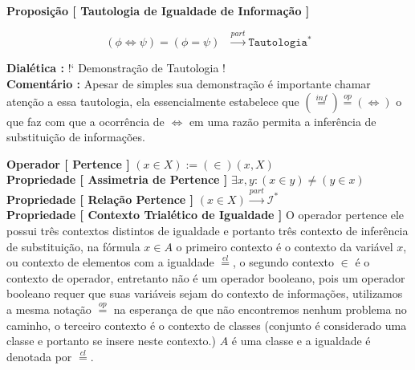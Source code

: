 \documentclass[10pt,a4paper]{report}
\begin{document}
\hspace{\baselineskip}

\textbf{Proposição [ Tautologia de Igualdade de Informação ]}

$$ (\phi \iff \psi) = ( \phi = \psi ) \texttt{   } \overset{part}{\rightarrow} \texttt{Tautologia}^* $$

\textbf{Dialética :} !` Demonstração de Tautologia !\\

\textbf{Comentário :} Apesar de simples sua demonstração é importante chamar atenção a essa tautologia, ela essencialmente estabelece que $( \overset{inf}{=} ) \overset{op}{=} ( \iff )$ o que faz com que a ocorrência de $\iff$ em uma razão permita a inferência de substituição de informações.



\hspace{\baselineskip}

\textbf{Operador [ Pertence ]} $  (x \in X) := (\in) (x,X) $\\

\textbf{Propriedade [ Assimetria de Pertence ]} $\exists x,y : (x \in y) \neq (y \in x)$\\

\textbf{Propriedade [ Relação Pertence ]} $ (x \in X) \overset{part}{\rightarrow} \mathcal{I}^* $\\

\textbf{Propriedade [ Contexto Trialético de Igualdade ]} O operador pertence ele possui três contextos distintos de igualdade e portanto três contexto de inferência de substituição, na fórmula $ x \in A$ o primeiro contexto é o contexto da variável $x$, ou contexto de elementos com a igualdade $\overset{el}{=}$, o segundo contexto $\in$ é o contexto de operador, entretanto não é um operador booleano, pois um operador booleano requer que suas variáveis sejam do contexto de informações, utilizamos a mesma notação $ \overset{op}{=} $ na esperança de que não encontremos nenhum problema no caminho, o terceiro contexto é o contexto de classes (conjunto é considerado uma classe e portanto se insere neste contexto.) $ A $ é uma classe e a igualdade é denotada por $\overset{cl}{=}$.\\
\end{document}

